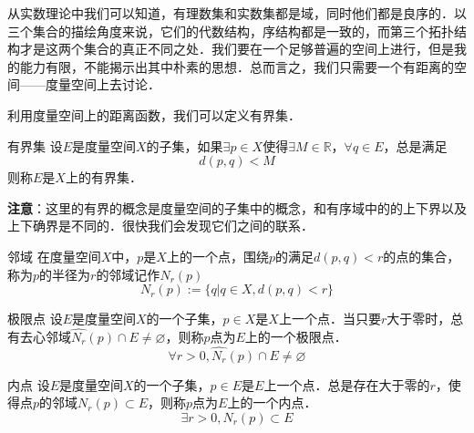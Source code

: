 



从实数理论中我们可以知道，有理数集和实数集都是域，同时他们都是良序的．以三个集合的描绘角度来说，它们的代数结构，序结构都是一致的，而第三个拓扑结构才是这两个集合的真正不同之处．我们要在一个足够普遍的空间上进行，但是我的能力有限，不能揭示出其中朴素的思想．总而言之，我们只需要一个有距离的空间——度量空间上去讨论．

利用度量空间上的距离函数，我们可以定义有界集．

\begin{definition}{有界集}
设$E$是度量空间$X$的子集，如果$\exists{p}\in{X}$使得$\exists{M}\in{\mathbb{R}}$，$\forall{q}\in{E}$，总是满足
\[d(p,q)<M\]
则称$E$是$X$上的有界集．
\end{definition}

\textbf{注意}：这里的有界的概念是度量空间的子集中的概念，和有序域中的的上下界以及上下确界是不同的．很快我们会发现它们之间的联系．

\begin{definition}{邻域}
在度量空间$X$中，$p$是$X$上的一个点，围绕$p$的满足$d(p,q)<r$的点的集合，称为$p$的半径为$r$的邻域记作$N_r(p)$
\begin{equation}
N_r(p):=\{q|q\in{X},d(p,q)<r\}
\end{equation}
\end{definition}


\begin{definition}{极限点}
设$E$是度量空间$X$的一个子集，$p\in{X}$是$X$上一个点．当只要$r$大于零时，总有{\heiti 去心邻域}$\hat{N_r}(p)\cap{E}\not=\varnothing$，则称$p$点为$E$上的一个{\heiti 极限点}．
\begin{equation}
\forall{r>0},\hat{N_r}(p)\cap{E}\not=\varnothing
\end{equation}
\end{definition}



\begin{definition}{内点}
设$E$是度量空间$X$的一个子集，$p\in{E}$是$E$上一个点．总是存在大于零的$r$，使得点$p$的邻域$N_r(p)\subset{E}$，则称$p$点为$E$上的一个{\heiti 内点}．
\begin{equation}
\exists{r>0},N_r(p)\subset{E}
\end{equation}
\end{definition}

